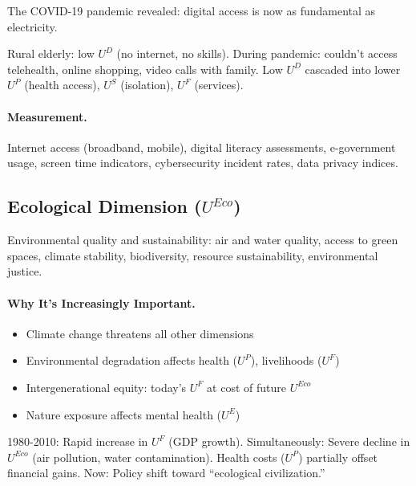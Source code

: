 The COVID-19 pandemic revealed: digital access is now as fundamental as electricity.

\begin{intuition}
Rural elderly: low $U^D$ (no internet, no skills).
During pandemic: couldn't access telehealth, online shopping, video calls with family.
Low $U^D$ cascaded into lower $U^P$ (health access), $U^S$ (isolation), $U^F$ (services).
\end{intuition}

\paragraph{Measurement.}
Internet access (broadband, mobile), digital literacy assessments,
e-government usage, screen time indicators, cybersecurity incident rates, data privacy indices.

\subsection{Ecological Dimension ($U^{Eco}$)}
\label{sec:fepsde-ecological}

\begin{definition}
Environmental quality and sustainability: air and water quality,
access to green spaces, climate stability, biodiversity, resource sustainability,
environmental justice.
\end{definition}

\paragraph{Why It's Increasingly Important.}
\begin{itemize}[nosep]
  \item Climate change threatens all other dimensions
  \item Environmental degradation affects health ($U^P$), livelihoods ($U^F$)
  \item Intergenerational equity: today's $U^F$ at cost of future $U^{Eco}$
  \item Nature exposure affects mental health ($U^E$)
\end{itemize}

\begin{intuition}
1980-2010: Rapid increase in $U^F$ (GDP growth).
Simultaneously: Severe decline in $U^{Eco}$ (air pollution, water contamination).
Health costs ($U^P$) partially offset financial gains.
Now: Policy shift toward ``ecological civilization.''
\end{intuition}

